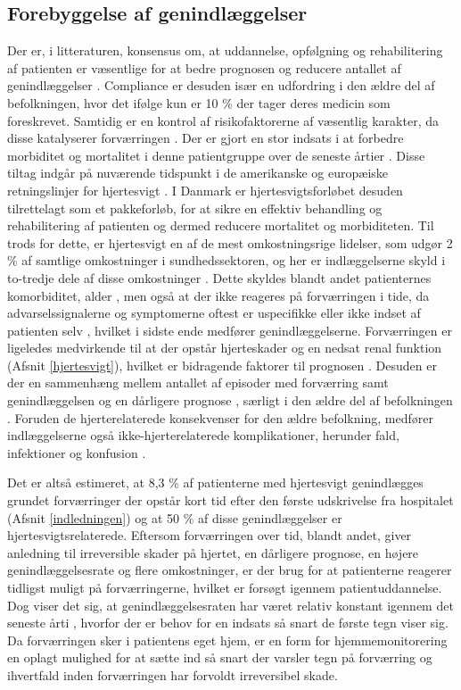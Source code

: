 \subsection{Forebyggelse af genindlæggelser} \label{forebyggelse}
Der er, i litteraturen, konsensus om, at uddannelse, opfølgning og rehabilitering af patienten er væsentlige for at bedre prognosen og reducere antallet af genindlæggelser \citep{kilde}. Compliance er desuden især en udfordring i den ældre del af befolkningen, hvor det ifølge \citet{Murray2009} kun er 10 \% der tager deres medicin som foreskrevet. Samtidig er en kontrol af risikofaktorerne af væsentlig karakter, da disse katalyserer forværringen \citep{sstpakke}. Der er gjort en stor indsats i at forbedre morbiditet og mortalitet i denne patientgruppe over de seneste årtier \citep{VBetihavas2013}. Disse tiltag indgår på nuværende tidspunkt i de amerikanske og europæiske retningslinjer for hjertesvigt \citep{Yancy2013}. I Danmark er hjertesvigtsforløbet desuden tilrettelagt som et pakkeforløb, for at sikre en effektiv behandling og rehabilitering af patienten \citep{sstpakke} og dermed reducere mortalitet og morbiditeten. Til trods for dette, er hjertesvigt en af de mest omkostningsrige lidelser, som udgør 2 \% af samtlige omkostninger i sundhedssektoren, og her er indlæggelserne skyld i to-tredje dele af disse omkostninger \citep{Shafie2018}. Dette skyldes blandt andet patienternes komorbiditet, alder \citep{JOyanguren2016}, men også at der ikke reageres på forværringen i tide, da advarselssignalerne og symptomerne oftest er uspecifikke eller ikke indset af patienten selv \citep{VConraads2011}, hvilket i sidste ende medfører genindlæggelserne. Forværringen er ligeledes medvirkende til at der opstår hjerteskader og en nedsat renal funktion (Afsnit \ref{hjertesvigt}), hvilket er bidragende faktorer til prognosen \citep{Gheorghiade2009}. Desuden er der en sammenhæng mellem antallet af episoder med forværring samt genindlæggelsen og en dårligere prognose \citep{JOyanguren2016}\citep{VConraads2011}\citep{VLueder2012}, særligt i den ældre del af befolkningen \citep{VLueder2012}.
Foruden de hjerterelaterede konsekvenser for den ældre befolkning, medfører indlæggelserne også ikke-hjerterelaterede komplikationer, herunder fald, infektioner og konfusion \citep{VBetihavas2013}.

Det er altså estimeret, at 8,3 \% af patienterne med hjertesvigt genindlægges grundet forværringer der opstår 
kort tid efter den første udskrivelse fra hospitalet (Afsnit \ref{indledningen}) og at 50 \% af disse genindlæggelser er hjertesvigtsrelaterede. Eftersom forværringen over tid, blandt andet, giver anledning til irreversible skader på hjertet, en dårligere prognose, en højere genindlæggelsesrate og flere omkostninger, er der brug for at patienterne reagerer tidligst muligt på forværringerne, hvilket er forsøgt igennem patientuddannelse. Dog viser det sig, at genindlæggelsesraten har været relativ konstant igennem det seneste årti \citep{Inan2018}, hvorfor der er behov for en indsats så snart de første tegn viser sig. Da forværringen sker i patientens eget hjem, er en form for hjemmemonitorering en oplagt mulighed for at sætte ind så snart der varsler tegn på forværring og ihvertfald inden forværringen har forvoldt irreversibel skade.